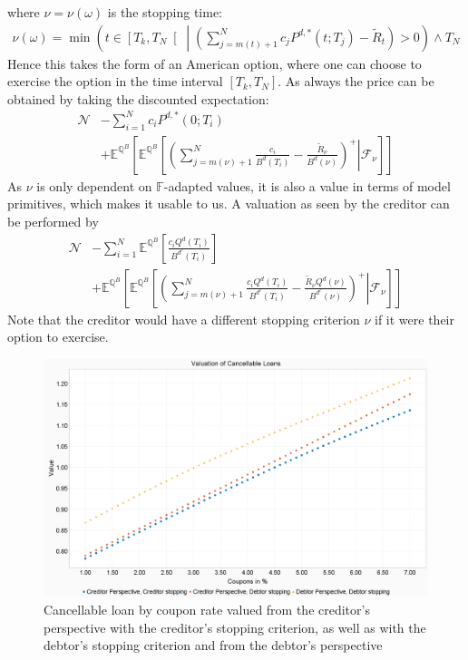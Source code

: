 \documentclass[12pt]{article}
\begin{document}
	where $\nu = \nu(\omega)$ is the stopping time:
	\begin{align*}
		\nu(\omega) = \min\left(t\in \left[T_k,T_N\right[ \;\left| \;\left(\sum_{j=m(t)+1}^{N}c_jP^{d,*}(t;T_j) - \tilde{R}_t\right) > 0\right. \right) \wedge T_N
	\end{align*}
	Hence this takes the form of an American option, where one can choose to exercise the option in the time interval $\left[T_k,T_N\right]$. As always the price can be obtained by taking the discounted expectation:
	\begin{align*}
		\mathcal{N} &-\sum_{i=1}^{N}c_iP^{d,*}(0;T_i) \\ &+\mathbb{E}^{\mathbb{Q}^B}\left[\mathbb{E}^{\mathbb{Q}^B}\left[\left.\left(\sum_{j=m(\nu)+1}^{N}\frac{c_i }{B^{d}(T_i)} - \frac{\tilde{R}_\nu}{B^{d}(\nu)}\right)^+ \right| \mathcal{F}_\nu\right]\right]
	\end{align*}
	As $\nu$ is only dependent on $\mathbb{F}$-adapted values, it is also a value in terms of model primitives, which makes it usable to us.
	A valuation as seen by the creditor can be performed by
	\begin{align*}
		\mathcal{N} &- \sum_{i=1}^{N}\mathbb{E}^{\mathbb{Q}^B}\left[\frac{c_iQ^d(T_i)}{B^{d^c}(T_i)}\right] \\ &+\mathbb{E}^{\mathbb{Q}^B}\left[\mathbb{E}^{\mathbb{Q}^B}\left[\left.\left(\sum_{j=m(\nu)+1}^{N}\frac{c_i Q^d(T_i)}{B^{d^c}(T_i)} - \frac{\tilde{R}_\nu Q^d(\nu)}{B^{d^c}(\nu)}\right)^+ \right| \mathcal{F}_\nu\right]\right]
	\end{align*}
	Note that the creditor would have a different stopping criterion $\nu$ if it were their option to exercise. 
	\begin{figure}[h!]
		\centering
		\includegraphics[width=0.7\linewidth]{figures/Today/CancellableLoan_byCouponRate}
		\caption{Cancellable loan by coupon rate valued from the creditor's perspective with the creditor's stopping criterion, as well as with the debtor's stopping criterion and from the debtor's perspective}
		\label{fig:cancellableloanbycouponrate}
	\end{figure}
\end{document}

